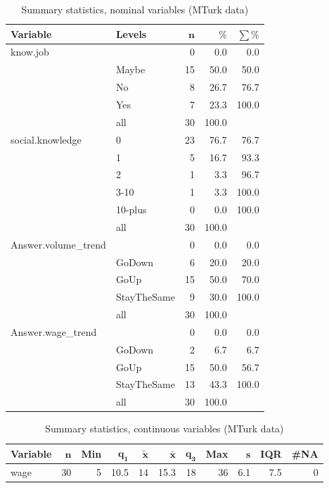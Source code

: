 \documentclass[a4paper,10pt]{article}\usepackage[]{graphicx}\usepackage[]{color}
\begin{document}
\begin{table}[ht]
\centering
{\footnotesize
\begin{tabular}{ll|rrr}
 \textbf{Variable} & \textbf{Levels} & $\mathbf{n}$ & $\mathbf{\%}$ & $\mathbf{\sum \%}$ \\ 
  \hline
know.job &  & 0 & 0.0 & 0.0 \\ 
   & Maybe & 15 & 50.0 & 50.0 \\ 
   & No & 8 & 26.7 & 76.7 \\ 
   & Yes & 7 & 23.3 & 100.0 \\ 
   \hline
 & all & 30 & 100.0 &  \\ 
   \hline
\hline
social.knowledge & 0 & 23 & 76.7 & 76.7 \\ 
   & 1 & 5 & 16.7 & 93.3 \\ 
   & 2 & 1 & 3.3 & 96.7 \\ 
   & 3-10 & 1 & 3.3 & 100.0 \\ 
   & 10-plus & 0 & 0.0 & 100.0 \\ 
   \hline
 & all & 30 & 100.0 &  \\ 
   \hline
\hline
Answer.volume\_trend &  & 0 & 0.0 & 0.0 \\ 
   & GoDown & 6 & 20.0 & 20.0 \\ 
   & GoUp & 15 & 50.0 & 70.0 \\ 
   & StayTheSame & 9 & 30.0 & 100.0 \\ 
   \hline
 & all & 30 & 100.0 &  \\ 
   \hline
\hline
Answer.wage\_trend &  & 0 & 0.0 & 0.0 \\ 
   & GoDown & 2 & 6.7 & 6.7 \\ 
   & GoUp & 15 & 50.0 & 56.7 \\ 
   & StayTheSame & 13 & 43.3 & 100.0 \\ 
   \hline
 & all & 30 & 100.0 &  \\ 
   \hline
\hline
\end{tabular}
}
\caption{Summary statistics, nominal variables (MTurk data)} 
\label{tab1:21-1090}
\end{table}
\begin{table}[ht]
\centering
{\footnotesize
\begin{tabular}{lrrrrrrrrrr}
 \textbf{Variable} & $\mathbf{n}$ & \textbf{Min} & $\mathbf{q_1}$ & $\mathbf{\widetilde{x}}$ & $\mathbf{\bar{x}}$ & $\mathbf{q_3}$ & \textbf{Max} & $\mathbf{s}$ & \textbf{IQR} & \textbf{\#NA} \\ 
  \hline
wage & 30 & 5 & 10.5 & 14 & 15.3 & 18 & 36 & 6.1 & 7.5 & 0 \\ 
  \end{tabular}
}
\caption{Summary statistics, continuous variables (MTurk data)} 
\label{tab2:21-1090}
\end{table}
\end{document}
